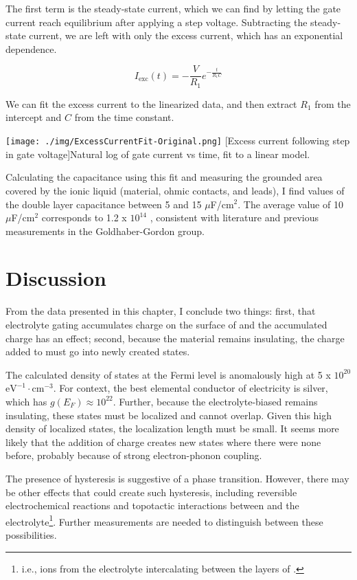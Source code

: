 The first term is the steady-state current, which we can find by letting the gate current reach equilibrium after applying a step voltage. Subtracting the steady-state current, we are left with only the excess current, which has an exponential dependence.

\begin{equation}
I_{\text{exc}}(t) = - \frac{V}{R_{1}} e^{-\frac{t}{R_{1}C}}
\end{equation}

We can fit the excess current to the linearized data, and then extract $R_{1}$ from the intercept and $C$ from the time constant.


\begin{centering}
\texttt{[image: ./img/ExcessCurrentFit-Original.png]}
  \captionsetup{width=0.75\textwidth}
  [Excess current following step in gate voltage]{Natural log of gate current vs time, fit to a linear model.} 
  \label{fig:QuantCharge-02}
\end{centering}

Calculating the capacitance using this fit and measuring the grounded area covered by the ionic liquid (material, ohmic contacts, and leads), I find values of the double layer capacitance between 5 and 15 $\mu$F/cm$^{2}$. The average value of 10 $\mu$F/cm$^{2}$ corresponds to 1.2 x $10^{14}$ \percmsq , consistent with literature and previous measurements in the Goldhaber-Gordon group.

\section{Discussion}

From the data presented in this chapter, I conclude two things: first, that electrolyte gating accumulates charge on the surface of \rucl and the accumulated charge has an effect; second, because the material remains insulating, the charge added to \rucl must go into newly created states.

The calculated density of states at the Fermi level is anomalously high at 5 x $10^{20}$ $\text{eV}^{-1} \cdot \text{cm}^{-3}$. For context, the best elemental conductor of electricity is silver, which has $g(E_{F}) \approx 10^{22}$. Further, because the electrolyte-biased \rucl remains insulating, these states must be localized and cannot overlap. Given this high density of localized states, the localization length must be small. It seems more likely that the addition of charge creates new states where there were none before, probably because of strong electron-phonon coupling.

The presence of hysteresis is suggestive of a phase transition. However, there may be other effects that could create such hysteresis, including reversible electrochemical reactions and topotactic interactions between \rucl and the electrolyte\footnote{i.e., ions from the electrolyte intercalating between the layers of \ruclnospace .}. Further measurements are needed to distinguish between these possibilities.

